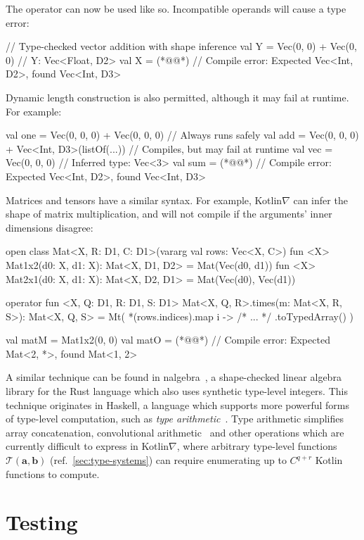 %
The operator \inline{+} can now be used like so. Incompatible operands will cause a type error:
%
\begin{kotlinlisting}
// Type-checked vector addition with shape inference
val Y = Vec(0, 0) + Vec(0, 0) // Y: Vec<Float, D2>
val X = (*@@*) // Compile error: Expected Vec<Int, D2>, found Vec<Int, D3>
\end{kotlinlisting}
%
Dynamic length construction is also permitted, although it may fail at runtime. For example:
%
\begin{kotlinlisting}
val one = Vec(0, 0, 0) + Vec(0, 0, 0) // Always runs safely
val add = Vec(0, 0, 0) + Vec<Int, D3>(listOf(...)) // Compiles, but may fail at runtime
val vec = Vec(0, 0, 0) // Inferred type: Vec<3>
val sum = (*@@*) // Compile error: Expected Vec<Int, D2>, found Vec<Int, D3>
\end{kotlinlisting}
%
Matrices and tensors have a similar syntax. For example, Kotlin$\nabla$ can infer the shape of matrix multiplication, and will not compile if the arguments' inner dimensions disagree:
%
\begin{kotlinlisting}
open class Mat<X, R: D1, C: D1>(vararg val rows: Vec<X, C>)
fun <X> Mat1x2(d0: X, d1: X): Mat<X, D1, D2> = Mat(Vec(d0, d1))
fun <X> Mat2x1(d0: X, d1: X): Mat<X, D2, D1> = Mat(Vec(d0), Vec(d1))

operator fun <X, Q: D1, R: D1, S: D1> Mat<X, Q, R>.times(m: Mat<X, R, S>): Mat<X, Q, S> =
    Mt( *(rows.indices).map { i -> /* ... */ }.toTypedArray() )

val matM = Mat1x2(0, 0)
val matO = (*@@*) // Compile error: Expected Mat<2, *>, found Mat<1, 2>
\end{kotlinlisting}
%
A similar technique can be found in nalgebra~\citep{crozet2019nalgebra}, a shape-checked linear algebra library for the Rust language which also uses synthetic type-level integers. This technique originates in Haskell, a language which supports more powerful forms of type-level computation, such as \textit{type arithmetic}~\citep{kiselyov2005number}. Type arithmetic simplifies array concatenation, convolutional arithmetic~\citep{dumoulin2016guide} and other operations which are currently difficult to express in Kotlin$\nabla$, where arbitrary type-level functions $\mathcal{T}(\mathbf a, \mathbf b)$ (ref.~\autoref{sec:type-systems}) can require enumerating up to $C^{q + r}$ Kotlin functions to compute.

\section{Testing}\label{sec:testing}

